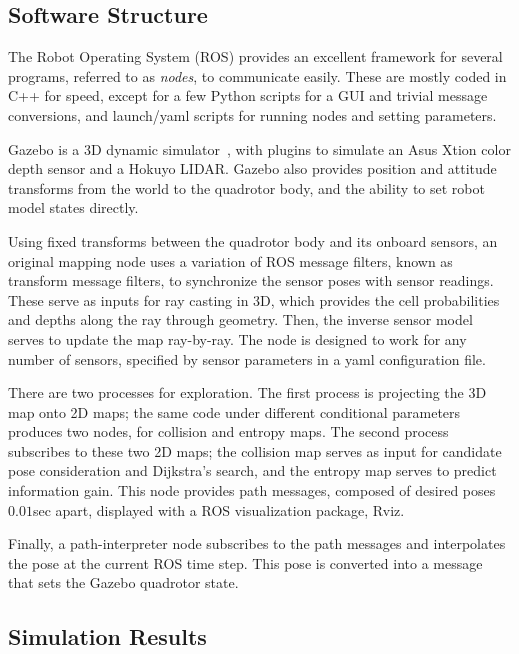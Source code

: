 \subsection{Software Structure}

The Robot Operating System (ROS) provides an excellent framework for several programs, referred to as \emph{nodes}, to communicate easily. These are mostly coded in C++ for speed, except for a few Python scripts for a GUI and trivial message conversions, and launch/yaml scripts for running nodes and setting parameters. 

Gazebo is a 3D dynamic simulator~\cite{KaeHow04}, with plugins to simulate an Asus Xtion color depth sensor and a Hokuyo LIDAR. Gazebo also provides position and attitude transforms from the world to the quadrotor body, and the ability to set robot model states directly. 

Using fixed transforms between the quadrotor body and its onboard sensors, an original mapping node uses a variation of ROS message filters, known as transform message filters, to synchronize the sensor poses with sensor readings. These serve as inputs for ray casting in 3D, which provides the cell probabilities and depths along the ray through geometry. Then, the inverse sensor model serves to update the map ray-by-ray.  The node is designed to work for any number of sensors, specified by sensor parameters in a yaml configuration file.

There are two processes for exploration. The first process is projecting the 3D map onto 2D maps; the same code under different conditional parameters produces two nodes, for collision and entropy maps. The second process subscribes to these two 2D maps; the collision map serves as input for candidate pose consideration and Dijkstra's search, and the entropy map serves to predict information gain. This node provides path messages, composed of desired poses $0.01$sec apart, displayed with a ROS visualization package, Rviz.

Finally, a path-interpreter node subscribes to the path messages and interpolates the pose at the current ROS time step. This pose is converted into a message that sets the Gazebo quadrotor state.


\subsection{Simulation Results}

